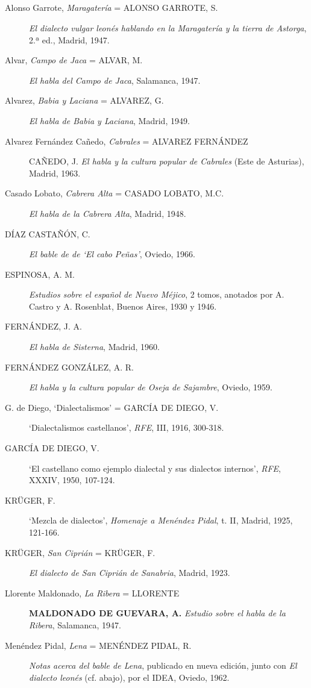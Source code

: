 \documentclass[11pt,spanish,b5paper]{book}
\begin{document}
\subsection{} \begin{description}
\item[Alonso Garrote, \textit{Maragatería} = ALONSO GARROTE, S.] \textit{El dialecto vulgar leonés hablando en la Maragatería y la tierra de Astorga}, 2.ª ed., Madrid, 1947.
\item[Alvar, \textit{Campo de Jaca} = ALVAR, M.] \textit{El habla del Campo de Jaca}, Salamanca, 1947.   
\item[Alvarez, \textit{Babia y Laciana} = ALVAREZ, G.] \textit{El habla de Babia y Laciana}, Madrid, 1949. 
\item[Alvarez Fernández Cañedo, \textit{Cabrales} = ALVAREZ FERNÁNDEZ]\textmd{CAÑEDO, J.} \textit{El habla y la cultura popular de Cabrales} (Este de Asturias), Madrid, 1963.  
\item[Casado Lobato, \textit{Cabrera Alta} = CASADO LOBATO, M.C.] \textit{El habla de la Cabrera Alta}, Madrid, 1948. 
\item[DÍAZ CASTAÑÓN, C.] \textit{El bable de de `El cabo Peñas'}, Oviedo, 1966. 
\item[ESPINOSA, A. M.] \textit{Estudios sobre el español de Nuevo Méjico}, 2 tomos, anotados por A. Castro y A. Rosenblat, Buenos Aires, 1930 y 1946. 
\item[FERNÁNDEZ, J. A.] \textit{El habla de Sisterna}, Madrid, 1960. 
\item[FERNÁNDEZ GONZÁLEZ, A. R.] \textit{El habla y la cultura popular de Oseja de Sajambre}, Oviedo, 1959.  
\item[G. de Diego, `Dialectalismos' = GARCÍA DE DIEGO, V.] `Dialectalismos castellanos', \textit{RFE}, III, 1916, 300-318. 
\item[GARCÍA DE DIEGO, V.] `El castellano como ejemplo dialectal y sus dialectos internos', \textit{RFE}, XXXIV, 1950, 107-124. 
\item[KRÜGER, F.] `Mezcla de dialectos', \textit{Homenaje a Menéndez Pidal}, t. II, Madrid, 1925, 121-166. 
\item[KRÜGER, \textit{San Ciprián} = KRÜGER, F.] \textit{El dialecto de San Ciprián de Sanabria}, Madrid, 1923. 
\item[Llorente Maldonado, \textit{La Ribera} = LLORENTE] \textbf{MALDONADO DE GUEVARA, A.} \textit{Estudio sobre el habla de la Ribera}, Salamanca, 1947.  
\item[Menéndez Pidal, \textit{Lena} = MENÉNDEZ PIDAL, R.] \textit{Notas acerca del bable de Lena}, publicado en nueva edición, junto con \textit{El dialecto leonés} (cf. abajo), por el IDEA, Oviedo, 1962.  

\end{description}
\end{document}

